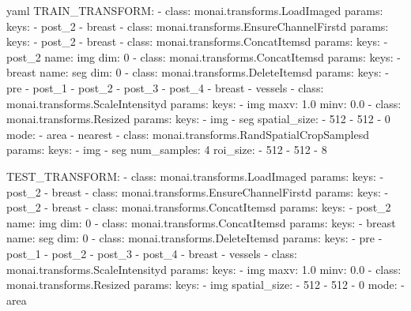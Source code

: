 \begin{code}{yaml}
TRAIN_TRANSFORM:
  - class: monai.transforms.LoadImaged                                                                  
    params:
      keys:
        - post_2
        - breast
  - class: monai.transforms.EnsureChannelFirstd
    params:
      keys:
        - post_2
        - breast
  - class: monai.transforms.ConcatItemsd                                                                
    params:
      keys:
        - post_2
      name: img
      dim: 0
  - class: monai.transforms.ConcatItemsd                                                                
    params:
      keys:
        - breast
      name: seg
      dim: 0
  - class: monai.transforms.DeleteItemsd                                                                
    params:
      keys:
        - pre
        - post_1
        - post_2
        - post_3
        - post_4
        - breast
        - vessels
  - class: monai.transforms.ScaleIntensityd
    params:
      keys:
        - img
      maxv: 1.0
      minv: 0.0
  - class: monai.transforms.Resized
    params:
      keys:
        - img
        - seg
      spatial_size: 
        - 512 
        - 512 
        - 0
      mode:
        - area
        - nearest
  - class: monai.transforms.RandSpatialCropSamplesd
    params:
      keys:
        - img
        - seg
      num_samples: 4
      roi_size: 
        - 512
        - 512
        - 8




TEST_TRANSFORM:
  - class: monai.transforms.LoadImaged                                                                  
    params:
      keys:
        - post_2
        - breast
  - class: monai.transforms.EnsureChannelFirstd
    params:
      keys:
        - post_2
        - breast
  - class: monai.transforms.ConcatItemsd                                                                
    params:
      keys:
        - post_2
      name: img
      dim: 0
  - class: monai.transforms.ConcatItemsd                                                                
    params:
      keys:
        - breast
      name: seg
      dim: 0
  - class: monai.transforms.DeleteItemsd                                                                
    params:
      keys:
        - pre
        - post_1
        - post_2
        - post_3
        - post_4
        - breast
        - vessels
  - class: monai.transforms.ScaleIntensityd
    params:
      keys:
        - img
      maxv: 1.0
      minv: 0.0
  - class: monai.transforms.Resized
    params:
      keys:
        - img
      spatial_size: 
        - 512 
        - 512 
        - 0
      mode:
        - area




\end{code}
